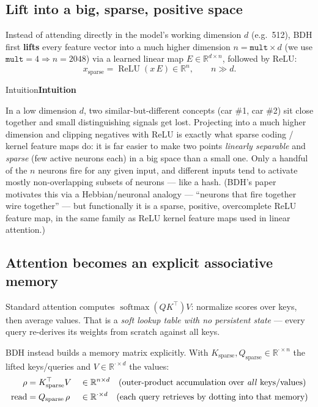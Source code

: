 \documentclass[11pt]{article}
\newlength{\boxinnerwidth}
\newenvironment{keybox}[1][]{%
  \def\tmptitle{#1}%
  \setlength{\boxinnerwidth}{\dimexpr\linewidth-2\fboxsep-2\fboxrule\relax}%
  \begin{lrbox}{\keyboxbin}
  \begin{minipage}{\boxinnerwidth}
  \ifx\tmptitle\empty\else\noindent\textbf{\tmptitle}\par\smallskip\fi
}{%
  \end{minipage}
  \end{lrbox}%
  \par\addvspace{8pt}\noindent\fcolorbox{blue!35!black}{blue!4}{\usebox{\keyboxbin}}\par\addvspace{8pt}%
}
\newcommand{\R}{\mathbb{R}}
\begin{document}
\subsection{Lift into a big, sparse, positive space}

Instead of attending directly in the model's working dimension $d$ (e.g.\ 512), BDH
first \textbf{lifts} every feature vector into a much higher dimension
$n = \texttt{mult} \times d$ (we use $\texttt{mult}=4 \Rightarrow n=2048$) via a
learned linear map $E \in \R^{d\times n}$, followed by ReLU:
\begin{equation}
  x_{\text{sparse}} = \operatorname{ReLU}(x\,E) \in \R^{n}, \qquad n \gg d .
\end{equation}

\begin{keybox}[Intuition]
In a low dimension $d$, two similar-but-different concepts (car \#1, car \#2) sit
close together and small distinguishing signals get lost. Projecting into a much
higher dimension and clipping negatives with ReLU is exactly what sparse coding /
kernel feature maps do: it is far easier to make two points \emph{linearly
separable} and \emph{sparse} (few active neurons each) in a big space than a small
one. Only a handful of the $n$ neurons fire for any given input, and different
inputs tend to activate mostly non-overlapping subsets of neurons --- like a hash.
(BDH's paper motivates this via a Hebbian/neuronal analogy --- ``neurons that fire
together wire together'' --- but functionally it is a sparse, positive, overcomplete
ReLU feature map, in the same family as ReLU kernel feature maps used in linear
attention.)
\end{keybox}

\subsection{Attention becomes an explicit associative memory}

Standard attention computes $\operatorname{softmax}(QK^{\top})V$: normalize scores
over keys, then average values. That is a \emph{soft lookup table with no
persistent state} --- every query re-derives its weights from scratch against all
keys.

BDH instead builds a memory matrix explicitly. With $K_{\text{sparse}}, Q_{\text{sparse}}
\in \R^{\cdot \times n}$ the lifted keys/queries and $V \in \R^{\cdot \times d}$ the
values:
\begin{align}
  \rho &= K_{\text{sparse}}^{\top} V && \in \R^{n \times d} \quad \text{(outer-product accumulation over \emph{all} keys/values)} \\
  \text{read} &= Q_{\text{sparse}}\,\rho && \in \R^{\cdot \times d} \quad \text{(each query retrieves by dotting into that memory)}
\end{align}
\end{document}
